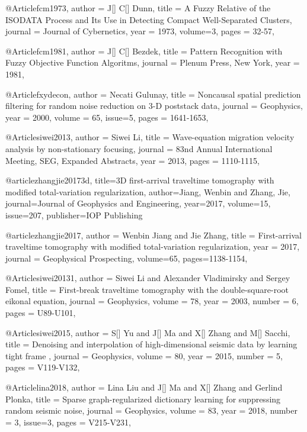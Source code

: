@Article{fcm1973,
  author =	 { J[] C[] Dunn},
  title =	 {A Fuzzy Relative of the ISODATA Process and Its Use in Detecting Compact Well-Separated Clusters},
  journal =	 {Journal of Cybernetics},
  year =	 1973,
  volume=3,
  pages =	 {32-57},
}

@Article{fcm1981,
  author =	 { J[] C[] Bezdek},
  title =	 {Pattern Recognition with Fuzzy Objective Function Algoritms},
  journal =	 {Plenum Press, New York},
  year =	 1981,
}

@Article{fxydecon,
  author =	 {Necati Gulunay},
  title =	 {Noncausal spatial prediction filtering for random noise reduction on 3-D poststack data},
  journal =	 {Geophysics},
  year =	 2000,
  volume = 65,
  issue={5}, 
  pages =	 {1641-1653},
}	



@Article{siwei2013,
  author = 	 {Siwei Li},
  title = 	 {Wave-equation migration velocity analysis by non-stationary focusing},
  journal = 	 {83nd Annual International Meeting, SEG, Expanded Abstracts},
  year = 	 2013,
  pages =	 {1110-1115},
}



@article{zhangjie20173d,
  title={3{D} first-arrival traveltime tomography with modified total-variation regularization},
  author={Jiang, Wenbin and Zhang, Jie},
  journal={Journal of Geophysics and Engineering},
  year={2017},
  volume=15,
  issue=207,
  publisher={IOP Publishing}
}

@article{zhangjie2017,
  author =	 {Wenbin Jiang and Jie Zhang},
  title =	 {First-arrival traveltime tomography with modified total-variation
regularization},
  year =	 2017,
  journal =	{Geophysical Prospecting},
  volume={65},
 pages=1138-1154,
}



@Article{siwei20131,
  author =	 { Siwei Li and Alexander Vladimirsky and Sergey Fomel},
  title =	 { First-break traveltime tomography with the
double-square-root eikonal equation},
  journal =	 {Geophysics},
  volume =	 78,
  year =	 2003,
  number =	 6,
  pages =	 {U89-U101},
}

@Article{siwei2015,
  author =	 { S[] Yu and J[] Ma and X[] Zhang and M[] Sacchi},
  title =	 { Denoising and interpolation of high-dimensional seismic data by learning tight frame },
  journal =	 {Geophysics},
  volume =	 80,
  year =	 2015,
  number =	 5,
  pages =	 {V119-V132},
}


@Article{lina2018,
  author =	 { Lina Liu and J[] Ma and X[] Zhang and Gerlind Plonka},
  title =	 { Sparse graph-regularized dictionary learning for suppressing random seismic noise},
  journal =	 {Geophysics},
  volume =	 83,
  year =	 2018,
  number =	 3,
  issue=3,
  pages =	 {V215-V231},
}


